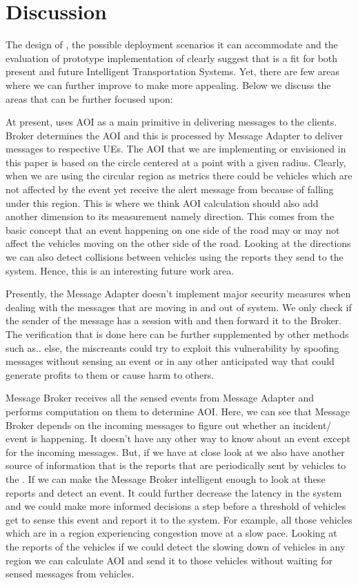 \section{Discussion}

The design of \name, the possible deployment scenarios it can
accommodate and the evaluation of prototype implementation of \name{} 
clearly suggest that \name{} is a fit for both present and future
Intelligent Transportation Systems. Yet, there are few areas where we
can further improve to make \name{} more appealing. Below we discuss
the areas that can be further focused upon:

At present, \name{} uses AOI as a main primitive in delivering
messages to the clients. \name{} Broker determines the AOI and this is
processed by Message Adapter to deliver messages to respective UEs.
The AOI that we are implementing or envisioned in this paper is based
on the circle centered at a point with a given radius. Clearly, when
we are using the circular region as metrics there could be vehicles
which are not affected by the event yet receive the alert message from
\name{} because of falling under this region. This is where we think
AOI calculation should also add another dimension to its measurement
namely direction. This comes from the basic concept that an event
happening on one side of the road may or may not affect the vehicles
moving on the other side of the road. Looking at the directions we can
also detect collisions between vehicles using the reports they send to
the system.  Hence, this is an interesting future work area.

Presently, the Message Adapter doesn't implement major security
measures when dealing with the messages that are moving in and out of
system. We only check if the sender of the message has a session with
\name{} and then forward it to the \name{} Broker. The verification
that is done here can be further supplemented by other methods such
as.. else, the miscreants could try to exploit this vulnerability by
spoofing messages without sensing an event or in any other anticipated
way that could generate profits to them or cause harm to others.

Message Broker receives all the sensed events from Message Adapter and
performs computation on them to determine AOI. Here, we can see that
Message Broker depends on the incoming messages to figure out whether
an incident/ event is happening. It doesn't have any other way to know
about an event except for the incoming messages. But, if we have at
close look at \name{} we also have another source of information that
is the reports that are periodically sent by vehicles to the
\name. If we can make the Message Broker intelligent enough to look
at these reports and detect an event. It could further decrease the
latency in the system and we could make more informed decisions a step
before a threshold of vehicles get to sense this event and report it
to the system. For example, all those vehicles which are in a region
experiencing congestion move at a slow pace. Looking at the reports of
the vehicles if we could detect the slowing down of vehicles in any
region we can calculate AOI and send it to those vehicles without
waiting for sensed messages from vehicles.

